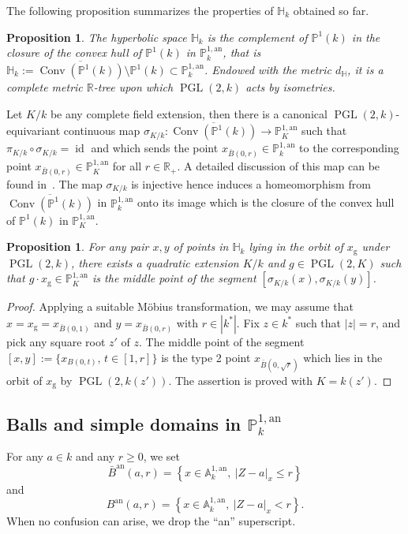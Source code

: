 \documentclass[11pt]{article}
\newtheorem{prop}[theo]{Proposition}
\theoremstyle{definition}
\numberwithin{equation}{section}
\numberwithin{figure}{section}
\numberwithin{table}{section}
\DeclareMathOperator{\conv}{Conv}
\DeclareMathOperator{\id}{id}
\DeclareMathOperator{\PGL}{PGL}
\newcommand{\hh}{\mathbb{H}}
\newcommand{\A}{{\mathbb A}}
\newcommand{\R}{{\mathbb R}}
\newcommand{\an}{\mathrm{an}}
\newcommand{\set}[1]{\left\{#1\right\}}
\newcommand{\abs}[1]{\left\vert#1\right\vert}
\newcommand{\PP}{\mathbb{P}}
\newcommand{\PGLk}{\PGL(2, k)}
\begin{document}
The following proposition summarizes the properties of $\hh_k$ obtained so far.

\begin{prop}
The hyperbolic space $\hh_k$ is the complement of $\PP^1(k)$ in the closure of the convex hull of $\PP^1(k)$ in $\PP^{1,\an}_{k}$, that is $\hh_k:= \overline{\conv(\PP^1(k))}\setminus \PP^1(k)\subset \PP^{1,\an}_k$. Endowed with the metric $d_\hh$, it is a complete metric $\R$-tree upon which $\PGLk$ acts by isometries.
\end{prop}

Let $K/k$ be any complete field extension, then there is a canonical $\PGL(2,k)$-equivariant continuous map $\sigma_{K/k} : \overline{\conv(\PP^1(k))} \to \PP^{1,\an}_K$ such that $\pi_{K/k} \circ \sigma_{K/k} = \id$ and which sends the point $x_{\bar{B}(0,r)}\in\PP^{1,\an}_k$ to the corresponding point $x_{\bar{B}(0,r)}\in \PP^{1,\an}_K$ for all $r\in \R_+$. A detailed discussion of this map can be found in~\cite{poineau}. The map $\sigma_{K/k}$ is injective hence induces a homeomorphism from $\overline{\conv(\PP^1(k))}$ in $ \PP^{1,\an}_k$ onto its image which is the closure of the convex hull of $ \PP^1(k)$ in $ \PP^{1,\an}_K$.

\begin{prop}\label{prop:quadratic}
For any pair $x, y$ of points in $ \hh_k$ lying in the orbit of $x_{\mathrm{g}}$ under $\PGL(2,k)$, there exists a quadratic extension $K/k$ and $g\in \PGL(2,K)$ such that $g\cdot x_{\mathrm{g}}\in \PP^{1,\an}_K$ is the middle point of the segment $[\sigma_{K/k}(x),\sigma_{K/k}(y)]$.
\end{prop}

\begin{proof}
Applying a suitable M\"obius transformation, we may assume that $x= x_{\mathrm{g}} =x_{\bar{B}(0,1)}$ and $y = x_{\bar{B}(0,r)}$ with $r\in |k^*|$. Fix $z\in k^*$ such that $|z| = r$, and pick any square root $z'$ of $z$. The middle point of the segment $[x,y]:= \{x_{B(0,t)}, \, t \in [1,r]\}$ is the type 2 point $x_{\bar B(0, \sqrt{r})}$ which lies in the orbit of $x_{\mathrm{g}}$ by $\PGL(2,k(z'))$. The assertion is proved with $K=k(z')$.
\end{proof}

\subsection{Balls and simple domains in \texorpdfstring{$\PP^{1, \an}_k$}{PP1, ank}}

For any $a\in k$ and any $r\geq 0$, we set
\begin{equation}\label{eq:ball1}
\bar{B}^\an(a, r) = \set{x\in \A^{1, \an}_k, \ \abs{Z-a}_x \leq r}
\end{equation}
and
\begin{equation}\label{eq:ball2}
B^\an(a, r) = \set{x\in \A^{1, \an}_k, \ \abs{Z-a}_x < r}.
\end{equation}
When no confusion can arise, we drop the ``an'' superscript.
\end{document}
